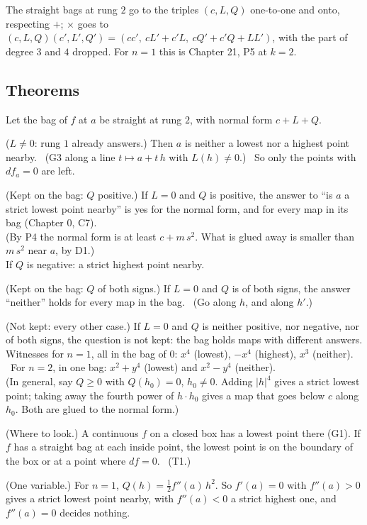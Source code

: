 \begin{lines}
\item[\lab{P6}] The straight bags at rung $2$ go to the triples $(c, L, Q)$ one-to-one and onto, respecting $+$; $\times$ goes to $(c, L, Q)(c', L', Q') = (cc',\ cL' + c'L,\ cQ' + c'Q + LL')$, with the part of degree $3$ and $4$ dropped. For $n = 1$ this is Chapter 21, P5 at $k = 2$.
\end{lines}

\subsection*{Theorems}

Let the bag of $f$ at $a$ be straight at rung $2$, with normal form $c + L + Q$.

\begin{lines}
\item[\lab{T1}] ($L \neq 0$: rung $1$ already answers.) Then $a$ is neither a lowest nor a highest point nearby. \ (G3 along a line $t \mapsto a + t\,h$ with $L(h) \neq 0$.) \ So only the points with $df_a = 0$ are left.
\item[\lab{T2}] (Kept on the bag: $Q$ positive.) If $L = 0$ and $Q$ is positive, the answer to ``is $a$ a strict lowest point nearby'' is yes for the normal form, and for every map in its bag (Chapter 0, C7). \\
(By P4 the normal form is at least $c + m\,s^2$. What is glued away is smaller than $m\,s^2$ near $a$, by D1.) \\
If $Q$ is negative: a strict highest point nearby.
\item[\lab{T3}] (Kept on the bag: $Q$ of both signs.) If $L = 0$ and $Q$ is of both signs, the answer ``neither'' holds for every map in the bag. \ (Go along $h$, and along $h'$.)
\item[\lab{T4}] (Not kept: every other case.) If $L = 0$ and $Q$ is neither positive, nor negative, nor of both signs, the question is not kept: the bag holds maps with different answers. \\
Witnesses for $n = 1$, all in the bag of $0$: $x^4$ (lowest), $-x^4$ (highest), $x^3$ (neither). \ For $n = 2$, in one bag: $x^2 + y^4$ (lowest) and $x^2 - y^4$ (neither). \\
(In general, say $Q \ge 0$ with $Q(h_0) = 0$, $h_0 \neq 0$. Adding $|h|^4$ gives a strict lowest point; taking away the fourth power of $h \cdot h_0$ gives a map that goes below $c$ along $h_0$. Both are glued to the normal form.)
\item[\lab{T5}] (Where to look.) A continuous $f$ on a closed box has a lowest point there (G1). If $f$ has a straight bag at each inside point, the lowest point is on the boundary of the box or at a point where $df = 0$. \ (T1.)
\item[\lab{T6}] (One variable.) For $n = 1$, $Q(h) = \tfrac12 f''(a)\,h^2$. So $f'(a) = 0$ with $f''(a) > 0$ gives a strict lowest point nearby, with $f''(a) < 0$ a strict highest one, and $f''(a) = 0$ decides nothing.
\end{lines}

